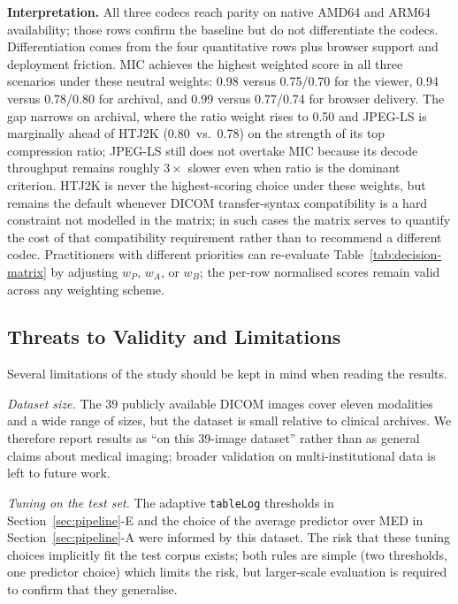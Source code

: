 \documentclass[journal]{IEEEtran}
\begin{document}
\textbf{Interpretation.}
All three codecs reach parity on native AMD64 and ARM64 availability;
those rows confirm the baseline but do not differentiate the codecs.
Differentiation comes from the four quantitative rows plus browser
support and deployment friction. MIC achieves the highest weighted
score in all three scenarios under these neutral weights: 0.98 versus
0.75/0.70 for the viewer, 0.94 versus 0.78/0.80 for archival, and 0.99
versus 0.77/0.74 for browser delivery. The gap narrows on archival,
where the ratio weight rises to 0.50 and JPEG-LS is marginally ahead of
HTJ2K (0.80~vs.\ 0.78) on the strength of its top compression ratio; JPEG-LS
still does not overtake MIC because its decode throughput remains
roughly $3\times$ slower even when ratio is the dominant criterion.
HTJ2K is never the highest-scoring choice under these weights, but
remains the default whenever DICOM transfer-syntax compatibility is a
hard constraint not modelled in the matrix; in such cases the matrix
serves to quantify the cost of that compatibility requirement rather
than to recommend a different codec. Practitioners with different
priorities can re-evaluate Table~\ref{tab:decision-matrix} by adjusting
$w_P$, $w_A$, or $w_B$; the per-row normalised scores remain valid
across any weighting scheme.

\subsection{Threats to Validity and Limitations}
\label{subsec:limitations}

Several limitations of the study should be kept in mind when reading
the results.

\textit{Dataset size.} The 39 publicly available DICOM images cover
eleven modalities and a wide range of sizes, but the dataset is small
relative to clinical archives. We therefore report results as ``on
this 39-image dataset'' rather than as general claims about medical
imaging; broader validation on multi-institutional data is left to
future work.

\textit{Tuning on the test set.} The adaptive \texttt{tableLog}
thresholds in Section~\ref{sec:pipeline}-E and the choice of the
average predictor over MED in Section~\ref{sec:pipeline}-A were
informed by this dataset. The risk that these tuning choices
implicitly fit the test corpus exists; both rules are simple
(two thresholds, one predictor choice) which limits the risk, but
larger-scale evaluation is required to confirm that they generalise.
\end{document}
